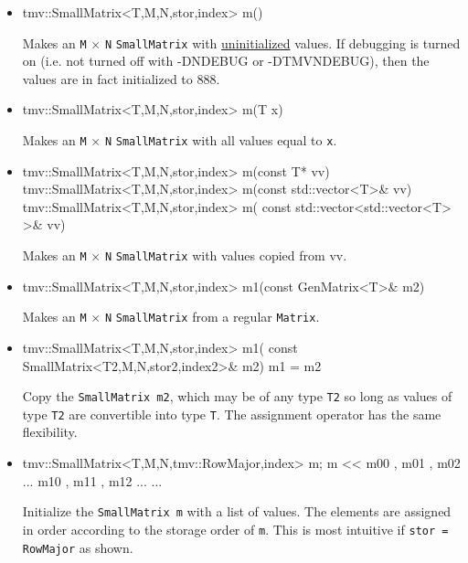 \documentclass[twoside,letterpaper,11pt]{article}
\renewcommand{\tt}[1]{{\lstinline {#1}}}
\begin{document}
\begin{itemize}
\item 
\begin{tmvcode}
tmv::SmallMatrix<T,M,N,stor,index> m()
\end{tmvcode}
Makes an \tt{M} $\times$ \tt{N} \tt{SmallMatrix} 
with \underline{uninitialized} values.
If debugging is turned on (i.e. not turned off
with -DNDEBUG or -DTMVNDEBUG), then the values are in fact initialized to 888. 

\item
\begin{tmvcode}
tmv::SmallMatrix<T,M,N,stor,index> m(T x)
\end{tmvcode}
Makes an \tt{M} $\times$ \tt{N} \tt{SmallMatrix} with all values equal to \tt{x}.

\item
\begin{tmvcode}
tmv::SmallMatrix<T,M,N,stor,index> m(const T* vv)
tmv::SmallMatrix<T,M,N,stor,index> m(const std::vector<T>& vv)
tmv::SmallMatrix<T,M,N,stor,index> m(
      const std::vector<std::vector<T> >& vv)
\end{tmvcode}
Makes an \tt{M} $\times$ \tt{N} \tt{SmallMatrix} with values copied from vv.

\item 
\begin{tmvcode}
tmv::SmallMatrix<T,M,N,stor,index> m1(const GenMatrix<T>& m2)
\end{tmvcode}
Makes an \tt{M} $\times$ \tt{N} \tt{SmallMatrix} from a regular \tt{Matrix}.

\item
\begin{tmvcode}
tmv::SmallMatrix<T,M,N,stor,index> m1(
      const SmallMatrix<T2,M,N,stor2,index2>& m2)
m1 = m2
\end{tmvcode}
Copy the \tt{SmallMatrix m2}, which may be of any type \tt{T2} so long
as values of type \tt{T2} are convertible into type \tt{T}.
The assignment operator has the same flexibility.

\item
\begin{tmvcode}
tmv::SmallMatrix<T,M,N,tmv::RowMajor,index> m;
m << m00 , m01 , m02 ...
     m10 , m11 , m12 ...
     ...
\end{tmvcode}
Initialize the \tt{SmallMatrix m} with a list of values.  The elements are assigned
in order according to the storage order of \tt{m}.  This is most intuitive if \tt{stor = RowMajor}
as shown.

\end{itemize}
\end{document}
